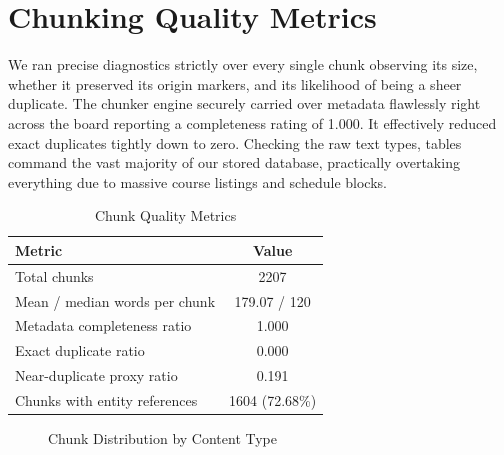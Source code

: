 \documentclass[12pt,a4paper]{report}
\begin{document}
\section{Chunking Quality Metrics}

We ran precise diagnostics strictly over every single chunk observing its size, whether it preserved its origin markers, and its likelihood of being a sheer duplicate. The chunker engine securely carried over metadata flawlessly right across the board reporting a completeness rating of 1.000. It effectively reduced exact duplicates tightly down to zero. Checking the raw text types, tables command the vast majority of our stored database, practically overtaking everything due to massive course listings and schedule blocks.

\begin{table}[htbp]
  \centering
    \vspace*{5pt}
  \begin{tabular}{|l|c|}
    \hline
    \textbf{Metric} & \textbf{Value} \\ \hline
    Total chunks & 2207 \\ \hline
    Mean / median words per chunk & 179.07 / 120 \\ \hline
    Metadata completeness ratio & 1.000 \\ \hline
    Exact duplicate ratio & 0.000 \\ \hline
    Near-duplicate proxy ratio & 0.191 \\ \hline
    Chunks with entity references & 1604 (72.68\%) \\ \hline
  \end{tabular}
  \caption{Chunk Quality Metrics}
  \label{tab:chunk_quality}

\end{table}

\begin{figure}[htbp]
\centering
{}
\caption{Chunk Distribution by Content Type}
\label{fig:chunk_distribution}
\end{figure}
\end{document}
